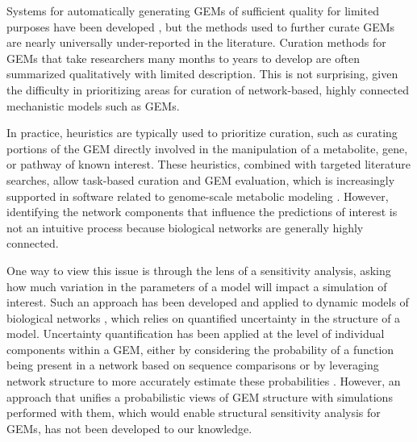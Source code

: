 \documentclass[11pt,twocolumn,notitlepage,openany,twoside]{book}
\begin{document}
\begin{refsection}
Systems for automatically generating GEMs of sufficient quality for limited purposes have been developed \cite{Henry2010-um}, but the methods used to further curate GEMs are nearly universally under-reported in the literature. Curation methods for GEMs that take researchers many months to years to develop are often summarized qualitatively with limited description. This is not surprising, given the difficulty in prioritizing areas for curation of network-based, highly connected mechanistic models such as GEMs.

In practice, heuristics are typically used to prioritize curation, such as curating portions of the GEM directly involved in the manipulation of a metabolite, gene, or pathway of known interest. These heuristics, combined with targeted literature searches, allow task-based curation and GEM evaluation, which is increasingly supported in software related to genome-scale metabolic modeling \cite{Lieven2018-fo, Wang2018-yn}. However, identifying the network components that influence the predictions of interest is not an intuitive process because biological networks are generally highly connected.

One way to view this issue is through the lens of a sensitivity analysis, asking how much variation in the parameters of a model will impact a simulation of interest. Such an approach has been developed and applied to dynamic models of biological networks \cite{Babtie2014-vy}, which relies on quantified uncertainty in the structure of a model. Uncertainty quantification has been applied at the level of individual components within a GEM, either by considering the probability of a function being present in a network based on sequence comparisons \cite{Benedict2014-yo} or by leveraging network structure to more accurately estimate these probabilities \cite{Plata2012-ys}. However, an approach that unifies a probabilistic views of GEM structure with simulations performed with them, which would enable structural sensitivity analysis for GEMs, has not been developed to our knowledge.


\end{refsection}
\end{document}
